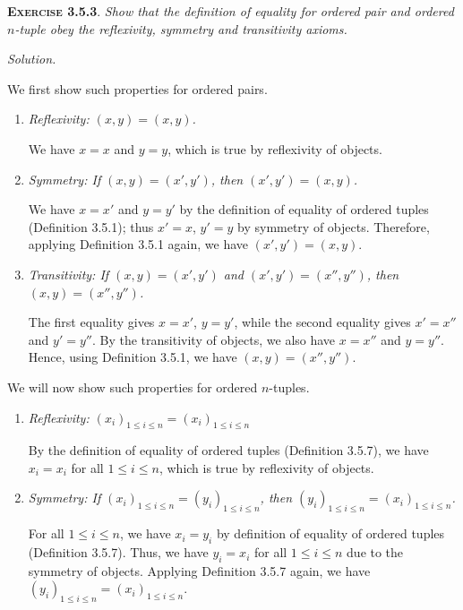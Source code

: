 \documentclass[12pt]{article}
\theoremstyle{remark}
\newenvironment{exer}[2]{
    \noindent \setlength{\parskip}{1em}%
    \textsc{\textbf{Exercise #1}}. \textit{#2} \par
    \noindent \textit{Solution.} %
}{\bigskip}
\begin{document}
\begin{exer}{3.5.3}{
    Show that the definition of equality for ordered pair and ordered $n$-tuple obey the reflexivity, symmetry and transitivity axioms.
}
    We first show such properties for ordered pairs.
    \begin{enumerate}[topsep=0mm,label=(\alph*)]
        \item \textit{Reflexivity: $(x, y) = (x, y)$.}

            We have $x = x$ and $y = y$, which is true by reflexivity of objects.

        \item \textit{Symmetry: If $(x, y) = (x', y')$, then $(x', y') = (x, y)$.}

            We have $x = x'$ and $y = y'$ by the definition of equality of ordered tuples (Definition 3.5.1); thus $x' = x$, $y' = y$ by symmetry of objects.
            Therefore, applying Definition 3.5.1 again, we have $(x', y') = (x, y)$.

        \item \textit{Transitivity: If $(x, y) = (x', y')$ and $(x', y') = (x'', y'')$, then $(x, y) = (x'', y'')$.}

            The first equality gives $x = x'$, $y = y'$, while the second equality gives $x' = x''$ and $y' = y''$.
            By the transitivity of objects, we also have $x = x''$ and $y = y''$.
            Hence, using Definition 3.5.1, we have $(x, y) = (x'', y'')$.
    \end{enumerate}

    We will now show such properties for ordered $n$-tuples.
    \begin{enumerate}[topsep=0mm,label=(\alph*)]
        \item \textit{Reflexivity: $(x_i)_{1 \le i \le n} = (x_i)_{1 \le i \le n}$}
            
            By the definition of equality of ordered tuples (Definition 3.5.7), we have $x_i = x_i$ for all $1 \le i \le n$, which is true by reflexivity of objects.

        \item \textit{Symmetry: If $(x_i)_{1 \le i \le n} = (y_i)_{1 \le i \le n}$, then $(y_i)_{1 \le i \le n} = (x_i)_{1 \le i \le n}$.}

            For all $1 \le i \le n$, we have $x_i = y_i$ by definition of equality of ordered tuples (Definition 3.5.7).
            Thus, we have $y_i = x_i$ for all $1 \le i \le n$ due to the symmetry of objects.
            Applying Definition 3.5.7 again, we have $(y_i)_{1 \le i \le n} = (x_i)_{1 \le i \le n}$.


\end{enumerate}
\end{exer}
\end{document}
